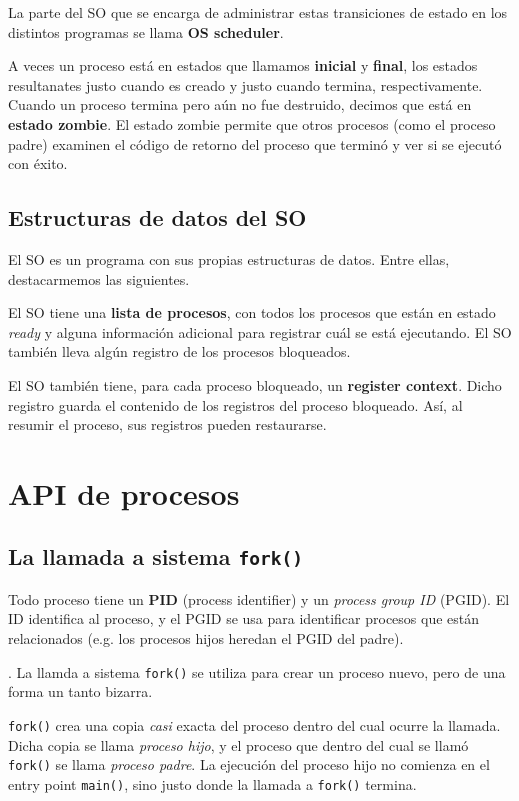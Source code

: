 \documentclass[12pt]{article}
\theoremstyle{definition}
\begin{document}
La parte del SO que se encarga de administrar estas transiciones de estado en
los distintos programas se llama \textbf{OS scheduler}.

A veces un proceso está en estados que llamamos \textbf{inicial} y
\textbf{final}, los estados resultanates justo cuando es creado y justo cuando
termina, respectivamente. Cuando un proceso termina pero aún no fue destruido,
decimos que está en \textbf{estado zombie}. El estado zombie permite que otros
procesos (como el proceso padre) examinen el código de retorno del proceso que
terminó y ver si se ejecutó con éxito.

\subsection{Estructuras de datos del SO}

El SO es un programa con sus propias estructuras de datos. Entre ellas,
destacarmemos las siguientes. 

El SO tiene una \textbf{lista de procesos}, con todos los procesos que están en
estado \textit{ready} y alguna información adicional para registrar cuál se está
ejecutando. El SO también lleva algún registro de los procesos bloqueados. 

El SO también tiene, para cada proceso bloqueado, un \textbf{register context}.
Dicho registro guarda el contenido de los registros del proceso bloqueado.  Así,
al resumir el proceso, sus registros pueden restaurarse.

\pagebreak 

\section{API de procesos}


\subsection{La llamada a sistema \texttt{fork()}}


Todo proceso tiene un \textbf{PID} (process identifier) y un \textit{process
group ID} (PGID). El ID identifica al proceso, y el PGID se usa para identificar
procesos que están relacionados (e.g. los procesos hijos heredan el PGID del
padre).


. La llamda a sistema
\texttt{fork()} se utiliza para crear un proceso nuevo, pero de una forma un tanto
bizarra. 

\texttt{fork()} crea una copia \textit{casi} exacta del proceso dentro del cual
ocurre la llamada. Dicha copia se llama \textit{proceso hijo}, y el proceso que
dentro del cual se llamó \texttt{fork()} se llama \textit{proceso padre}. La
ejecución del proceso hijo no comienza en el entry point \texttt{main()}, sino
justo donde la llamada a \texttt{fork()} termina.
\end{document}

